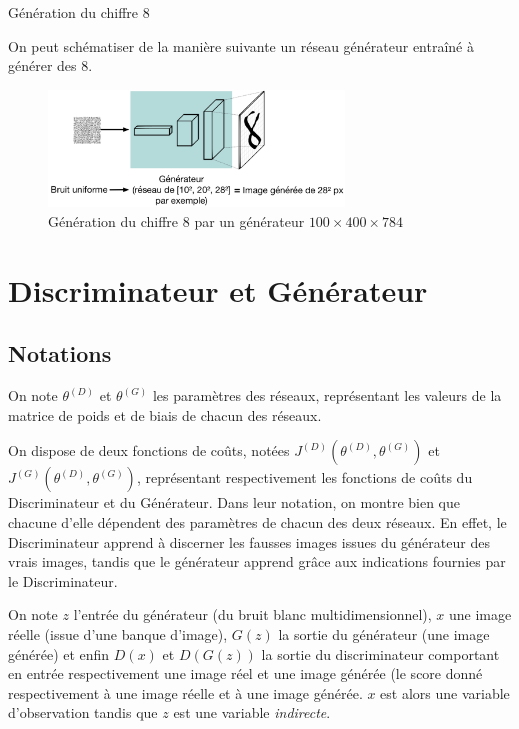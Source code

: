 \begin{example} Génération du chiffre 8

On peut schématiser de la manière suivante un réseau générateur entraîné à générer des 8.
\begin{figure}[h]
\begin{center}
\includegraphics[width=0.7\textwidth]{images/Colloque/GAN/generateur.png}\caption{Génération du chiffre 8 par un générateur $100\times 400\times 784$}
\end{center}
\end{figure} 
\end{example}

\section{Discriminateur et Générateur}
\subsection{Notations}
\label{notations}
On note $\theta^{(D)}$ et $\theta^{(G)}$ les paramètres des réseaux, représentant les valeurs de la matrice de poids et de biais de chacun des réseaux.

On dispose de deux fonctions de coûts, notées $J^{(D)}(\theta^{(D)}, \theta^{(G)})$ et $J^{(G)}(\theta^{(D)}, \theta^{(G)})$, représentant respectivement les fonctions de coûts du Discriminateur et du Générateur. Dans leur notation, on montre bien que chacune d'elle dépendent des paramètres de chacun des deux réseaux. En effet, le Discriminateur apprend à discerner les fausses images issues du générateur des vrais images, tandis que le générateur apprend grâce aux indications fournies par le Discriminateur.

On note $z$ l'entrée du générateur (du bruit blanc multidimensionnel), $x$ une image réelle (issue d'une banque d'image), $G(z)$ la sortie du générateur (une image générée) et enfin $D(x)$ et $D(G(z))$ la sortie du discriminateur comportant en entrée respectivement une image réel et une image générée (le score donné respectivement à une image réelle et à une image générée. $x$ est alors une variable d'observation tandis que $z$ est une variable \textit{indirecte}.

